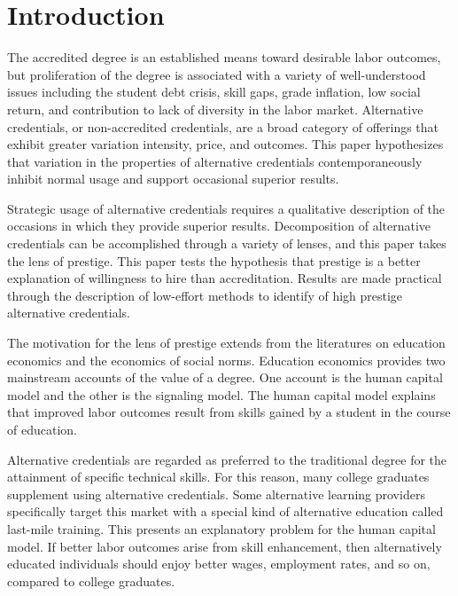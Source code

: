 \documentclass[review]{elsarticle}
\begin{document}
\pagebreak
\linenumbers

\section{Introduction}

The accredited degree is an established means toward desirable labor outcomes,
but proliferation of the degree is associated with a variety of well-understood issues including
the student debt crisis, skill gaps, grade inflation, low social return,
and contribution to lack of diversity in the labor market.
Alternative credentials, or non-accredited credentials,
are a broad category of offerings that exhibit greater variation intensity, price, and outcomes.
This paper hypothesizes that variation in the properties of alternative credentials
contemporaneously inhibit normal usage and support occasional superior results.

Strategic usage of alternative credentials requires a qualitative description of the occasions in which they provide superior results.
Decomposition of alternative credentials can be accomplished through a variety of lenses,
and this paper takes the lens of prestige.
This paper tests the hypothesis that prestige is a better explanation of willingness to hire
than accreditation.
Results are made practical through the description of low-effort methods to identify of high prestige alternative credentials.

The motivation for the lens of prestige extends from the literatures on education economics and the economics of social norms.
Education economics provides two mainstream accounts of the value of a degree.
One account is the human capital model and the other is the signaling model.
The human capital model explains that improved labor outcomes result from skills gained by a student in the course of education.

Alternative credentials are regarded as preferred to the traditional degree for the attainment of specific technical skills\cite{craig2018new}.
For this reason, many college graduates supplement using alternative credentials.
Some alternative learning providers specifically target this market with a special kind of alternative education called last-mile training.
This presents an explanatory problem for the human capital model.
If better labor outcomes arise from skill enhancement,
then alternatively educated individuals should enjoy better wages, employment rates, and so on,
compared to college graduates.
\end{document}
